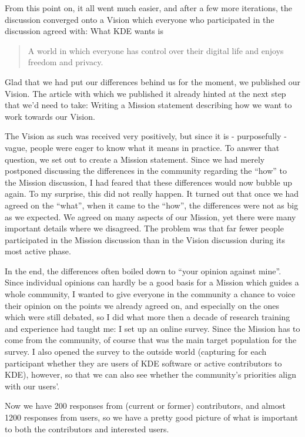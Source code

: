 From this point on, it all went much easier, and after a few more iterations, the discussion converged onto a Vision which everyone who participated in the discussion agreed with: What KDE wants is
\begin{quote}
 A world in which everyone has control over their digital life and enjoys freedom and privacy.
\end{quote}
Glad that we had put our differences behind us for the moment, we published our Vision. The article with which we published it already hinted at the next step that we'd need to take: Writing a Mission statement describing how we want to work towards our Vision.

The Vision as such was received very positively, but since it is - purposefully - vague, people were eager to know what it means in practice. To answer that question, we set out to create a Mission statement. Since we had merely postponed discussing the differences in the community regarding the ``how'' to the Mission discussion, I had feared that these differences would now bubble up again. To my surprise, this did not really happen. It turned out that once we had agreed on the ``what'', when it came to the ``how'', the differences were not as big as we expected. We agreed on many aspects of our Mission, yet there were many important details where we disagreed. The problem was that far fewer people participated in the Mission discussion than in the Vision discussion during its most active phase.

In the end, the differences often boiled down to ``your opinion against mine''. Since individual opinions can hardly be a good basis for a Mission which guides a whole community, I wanted to give everyone in the community a chance to voice their opinion on the points we already agreed on, and especially on the ones which were still debated, so I did what more then a decade of research training and experience had taught me: I set up an online survey. Since the Mission has to come from the community, of course that was the main target population for the survey. I also opened the survey to the outside world (capturing for each participant whether they are users of KDE software or active contributors to KDE), however, so that we can also see whether the community's priorities align with our users'.

Now we have 200 responses from (current or former) contributors, and almost 1200 responses from users, so we have a pretty good picture of what is important to both the contributors and interested users.


